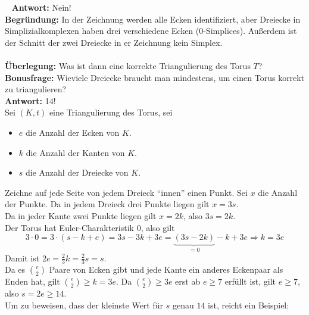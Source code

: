 \begin{solution}
\
  \textbf{Antwort:} Nein! \\
  \textbf{Begründung:} In der Zeichnung werden alle Ecken identifiziert, aber Dreiecke in Simplizialkomplexen haben drei verschiedene Ecken (0-Simplices). Außerdem ist der Schnitt der zwei Dreiecke in er Zeichnung kein Simplex. \\
  \\
  \textbf{Überlegung:} Was ist dann eine korrekte Triangulierung des Torus \( T \)? \\
  
  \textbf{Bonusfrage:} Wieviele Dreiecke braucht man mindestens, um einen Torus korrekt zu triangulieren? \\
  \textbf{Antwort:} 14! \\
  Sei \( (K,t) \) eine Triangulierung des Torus, sei 
  \begin{itemize}
    \item \( e \) die Anzahl der Ecken von \( K \).
    \item \( k \) die Anzahl der Kanten von \( K \).
    \item \( s \) die Anzahl der Dreiecke von \( K \).
  \end{itemize} 
  Zeichne auf jede Seite von jedem Dreieck ``innen'' einen Punkt. Sei \( x \) die Anzahl der Punkte.
  Da in jedem Dreieck drei Punkte liegen gilt \( x = 3s \). \\
  Da in jeder Kante zwei Punkte liegen gilt \( x = 2k \), also \( 3s = 2k \). \\
  Der Torus hat Euler-Charakteristik \( 0 \), also gilt
  \begin{equation*}
    3 \cdot 0 = 3 \cdot (s - k + e) = 3s - 3k +3e = \underbrace{(3s -2k)}_{= 0} - k + 3e \Rightarrow k = 3e
  \end{equation*}
  Damit ist \( 2e = \frac{2}{3} k = \frac{2}{3} s = s \). \\
  
  Da es \( \binom{e}{2} \) Paare von Ecken gibt und jede Kante ein anderes Eckenpaar als Enden hat, gilt  \( \binom{e}{2} \geq k = 3e \). Da \( \binom{e}{2} \geq 3e \) erst ab \( e \geq 7 \) erfüllt ist, gilt \( e \geq 7 \), also \( s = 2e \geq 14 \). \\
  Um zu beweisen, dass der kleinste Wert für \( s \) genau \( 14 \) ist, reicht ein Beispiel: 
  
\end{solution}

